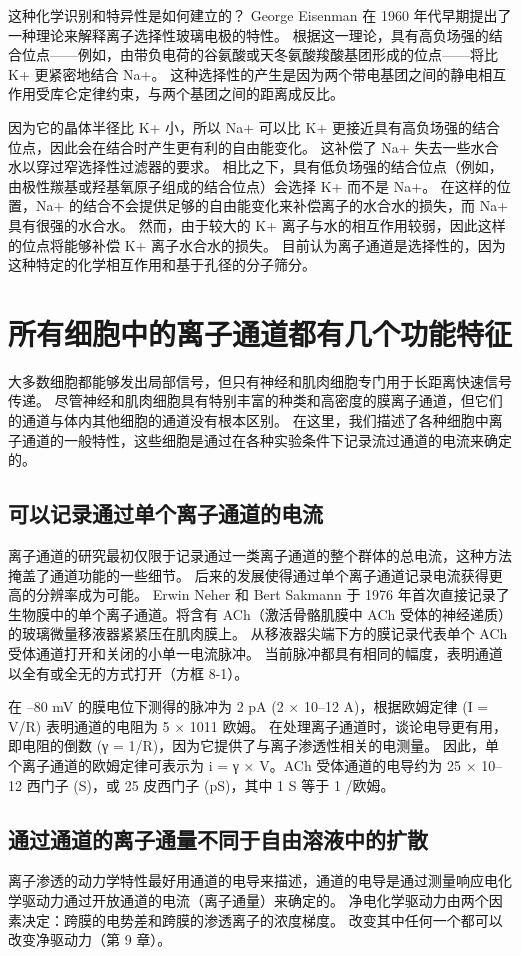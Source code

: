 这种化学识别和特异性是如何建立的？ George Eisenman 在 1960 年代早期提出了一种理论来解释离子选择性玻璃电极的特性。 根据这一理论，具有高负场强的结合位点——例如，由带负电荷的谷氨酸或天冬氨酸羧酸基团形成的位点——将比 K+ 更紧密地结合 Na+。 这种选择性的产生是因为两个带电基团之间的静电相互作用受库仑定律约束，与两个基团之间的距离成反比。

因为它的晶体半径比 K+ 小，所以 Na+ 可以比 K+ 更接近具有高负场强的结合位点，因此会在结合时产生更有利的自由能变化。 这补偿了 Na+ 失去一些水合水以穿过窄选择性过滤器的要求。 相比之下，具有低负场强的结合位点（例如，由极性羰基或羟基氧原子组成的结合位点）会选择 K+ 而不是 Na+。 在这样的位置，Na+ 的结合不会提供足够的自由能变化来补偿离子的水合水的损失，而 Na+ 具有很强的水合水。 然而，由于较大的 K+ 离子与水的相互作用较弱，因此这样的位点将能够补偿 K+ 离子水合水的损失。 目前认为离子通道是选择性的，因为这种特定的化学相互作用和基于孔径的分子筛分。


\section{所有细胞中的离子通道都有几个功能特征}
大多数细胞都能够发出局部信号，但只有神经和肌肉细胞专门用于长距离快速信号传递。 尽管神经和肌肉细胞具有特别丰富的种类和高密度的膜离子通道，但它们的通道与体内其他细胞的通道没有根本区别。 在这里，我们描述了各种细胞中离子通道的一般特性，这些细胞是通过在各种实验条件下记录流过通道的电流来确定的。

\subsection{可以记录通过单个离子通道的电流}
离子通道的研究最初仅限于记录通过一类离子通道的整个群体的总电流，这种方法掩盖了通道功能的一些细节。 后来的发展使得通过单个离子通道记录电流获得更高的分辨率成为可能。 Erwin Neher 和 Bert Sakmann 于 1976 年首次直接记录了生物膜中的单个离子通道。将含有 ACh（激活骨骼肌膜中 ACh 受体的神经递质）的玻璃微量移液器紧紧压在肌肉膜上。 从移液器尖端下方的膜记录代表单个 ACh 受体通道打开和关闭的小单一电流脉冲。 当前脉冲都具有相同的幅度，表明通道以全有或全无的方式打开（方框 8-1）。

在 –80 mV 的膜电位下测得的脉冲为 2 pA (2 × 10–12 A)，根据欧姆定律 (I = V/R) 表明通道的电阻为 5 × 1011 欧姆。 在处理离子通道时，谈论电导更有用，即电阻的倒数 (γ = 1/R)，因为它提供了与离子渗透性相关的电测量。 因此，单个离子通道的欧姆定律可表示为 i = γ × V。ACh 受体通道的电导约为 25 × 10–12 西门子 (S)，或 25 皮西门子 (pS)，其中 1 S 等于 1 /欧姆。

\subsection{通过通道的离子通量不同于自由溶液中的扩散}
离子渗透的动力学特性最好用通道的电导来描述，通道的电导是通过测量响应电化学驱动力通过开放通道的电流（离子通量）来确定的。 净电化学驱动力由两个因素决定：跨膜的电势差和跨膜的渗透离子的浓度梯度。 改变其中任何一个都可以改变净驱动力（第 9 章）。

